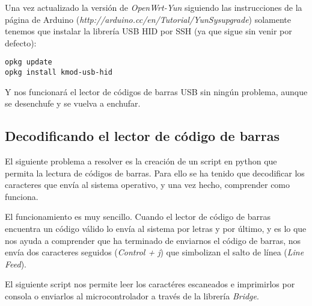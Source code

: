 Una vez actualizado la versión de \emph{OpenWrt-Yun} siguiendo las instrucciones de la página de Arduino (\emph{http://arduino.cc/en/Tutorial/YunSysupgrade}) solamente tenemos que instalar la librería USB HID por SSH (ya que sigue sin venir por defecto):

	\begin{lstlisting}
opkg update
opkg install kmod-usb-hid
	\end{lstlisting}

Y nos funcionará el lector de códigos de barras USB sin ningún problema, aunque se desenchufe y se vuelva a enchufar.

\subsection{Decodificando el lector de código de barras}

El siguiente problema a resolver es la creación de un script en python que permita la lectura de códigos de barras. Para ello se ha tenido que decodificar los caracteres que envía al sistema operativo, y una vez hecho, comprender como funciona.

El funcionamiento es muy sencillo. Cuando el lector de código de barras encuentra un código válido lo envía al sistema por letras y por último, y es lo que nos ayuda a comprender que ha terminado de enviarnos el código de barras, nos envía dos caracteres seguidos (\emph{Control + j}) que simbolizan el salto de línea (\emph{Line Feed}).

El siguiente script nos permite leer los caractéres escaneados e imprimirlos por consola o enviarlos al microcontrolador a través de la librería \emph{Bridge}.

